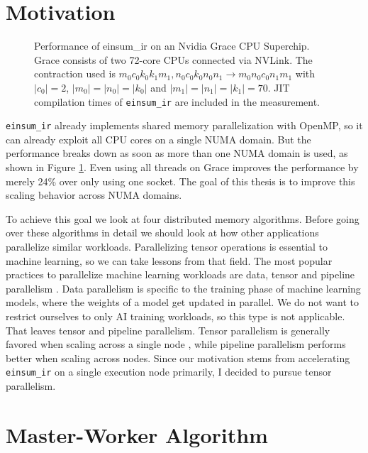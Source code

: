
\section{Motivation}

\begin{figure}[ht]
  \caption{
    Performance of einsum\_ir on an Nvidia Grace CPU Superchip.
    Grace consists of two 72-core CPUs connected via NVLink.
    The contraction used is $m_0c_0k_0k_1m_1, n_0c_0k_0n_0n_1 \rightarrow m_0n_0c_0n_1m_1$ with $|c_0|=2$, $|m_0|=|n_0|=|k_0|$ and $|m_1|=|n_1|=|k_1|=70$.
    JIT compilation times of \texttt{einsum\_ir} are included in the measurement.
    }
  \label{fig:perf_threads}
\end{figure}

\texttt{einsum\_ir} already implements shared memory parallelization with OpenMP\cite{openMP}, so it can already exploit all CPU cores on a single NUMA domain.
But the performance breaks down as soon as more than one NUMA domain is used, as shown in Figure \ref{fig:perf_threads}.
Even using all threads on Grace improves the performance by merely 24\% over only using one socket.
The goal of this thesis is to improve this scaling behavior across NUMA domains.

To achieve this goal we look at four distributed memory algorithms.
Before going over these algorithms in detail we should look at how other applications parallelize similar workloads.
Parallelizing tensor operations is essential to machine learning, so we can take lessons from that field.
The most popular practices to parallelize machine learning workloads are data, tensor and pipeline parallelism \cite{megatronLM}.
Data parallelism is specific to the training phase of machine learning models, where the weights of a model get updated in parallel.
We do not want to restrict ourselves to only AI training workloads, so this type is not applicable.
That leaves tensor and pipeline parallelism.
Tensor parallelism is generally favored when scaling across a single node \cite{megatronLM}, while pipeline parallelism performs better when scaling across nodes.
Since our motivation stems from accelerating \texttt{einsum\_ir} on a single execution node primarily, I decided to pursue tensor parallelism.


\section{Master-Worker Algorithm}

